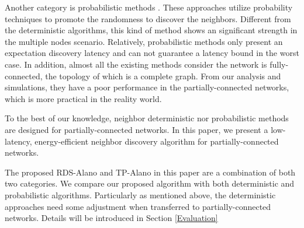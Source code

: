 Another category is probabilistic methods \cite{mcglynn2001birthday,
vasudevan2009neighbor,you2011aloha,song2014probabilistic}. These
approaches utilize probability techniques to promote the randomness 
to discover the neighbors. Different from the deterministic algorithms, 
this kind of method shows an significant strength in the multiple nodes scenario. 
Relatively, probabilistic methods only present an expectation discovery latency and 
can not guarantee a latency bound in the worst case.
In addition, almost all the existing methods consider the network is fully-connected,
the topology of which is a complete graph. From our analysis and simulations, 
they have a poor performance in the partially-connected networks, which is more 
practical in the reality world.

To the best of our knowledge, neighbor deterministic nor probabilistic methods are designed for
partially-connected networks. In this paper, we present a low-latency, energy-efficient 
neighbor discovery algorithm for partially-connected networks.

The proposed RDS-Alano and TP-Alano in this paper are a combination of both two categories.
We compare our proposed algorithm with both deterministic and probabilistic algorithms. 
Particularly as mentioned above, the deterministic approaches need some adjustment 
when transferred to partially-connected networks. Details will be introduced in Section \ref{Evaluation}




